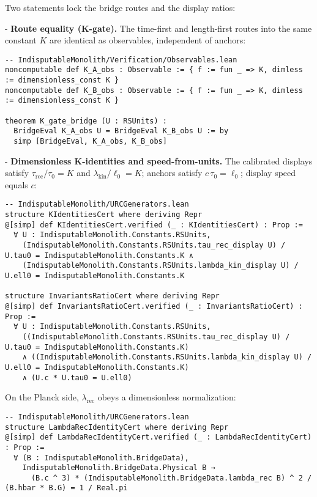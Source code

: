 \documentclass[11pt,a4paper,twoside]{article}
\numberwithin{equation}{section}
\theoremstyle{customthm}
\theoremstyle{customdef}
\theoremstyle{customrem}
\begin{document}
Two statements lock the bridge routes and the display ratios:

- \textbf{Route equality (K-gate).} The time-first and length-first routes into the same constant \(K\) are identical as observables, independent of anchors:
\begin{lstlisting}
-- IndisputableMonolith/Verification/Observables.lean
noncomputable def K_A_obs : Observable := { f := fun _ => K, dimless := dimensionless_const K }
noncomputable def K_B_obs : Observable := { f := fun _ => K, dimless := dimensionless_const K }

theorem K_gate_bridge (U : RSUnits) :
  BridgeEval K_A_obs U = BridgeEval K_B_obs U := by
  simp [BridgeEval, K_A_obs, K_B_obs]
\end{lstlisting}

- \textbf{Dimensionless K-identities and speed-from-units.} The calibrated displays satisfy \(\tau_{\mathrm{rec}}/\tau_0 = K\) and \(\lambda_{\mathrm{kin}}/\ell_0 = K\); anchors satisfy \(c\,\tau_0=\ell_0\); display speed equals \(c\):
\begin{lstlisting}
-- IndisputableMonolith/URCGenerators.lean
structure KIdentitiesCert where deriving Repr
@[simp] def KIdentitiesCert.verified (_ : KIdentitiesCert) : Prop :=
  ∀ U : IndisputableMonolith.Constants.RSUnits,
    (IndisputableMonolith.Constants.RSUnits.tau_rec_display U) / U.tau0 = IndisputableMonolith.Constants.K ∧
    (IndisputableMonolith.Constants.RSUnits.lambda_kin_display U) / U.ell0 = IndisputableMonolith.Constants.K

structure InvariantsRatioCert where deriving Repr
@[simp] def InvariantsRatioCert.verified (_ : InvariantsRatioCert) : Prop :=
  ∀ U : IndisputableMonolith.Constants.RSUnits,
    ((IndisputableMonolith.Constants.RSUnits.tau_rec_display U) / U.tau0 = IndisputableMonolith.Constants.K)
    ∧ ((IndisputableMonolith.Constants.RSUnits.lambda_kin_display U) / U.ell0 = IndisputableMonolith.Constants.K)
    ∧ (U.c * U.tau0 = U.ell0)
\end{lstlisting}

On the Planck side, \(\lambda_{\mathrm{rec}}\) obeys a dimensionless normalization:
\begin{lstlisting}
-- IndisputableMonolith/URCGenerators.lean
structure LambdaRecIdentityCert where deriving Repr
@[simp] def LambdaRecIdentityCert.verified (_ : LambdaRecIdentityCert) : Prop :=
  ∀ (B : IndisputableMonolith.BridgeData),
    IndisputableMonolith.BridgeData.Physical B →
      (B.c ^ 3) * (IndisputableMonolith.BridgeData.lambda_rec B) ^ 2 / (B.hbar * B.G) = 1 / Real.pi
\end{lstlisting}
\end{document}
